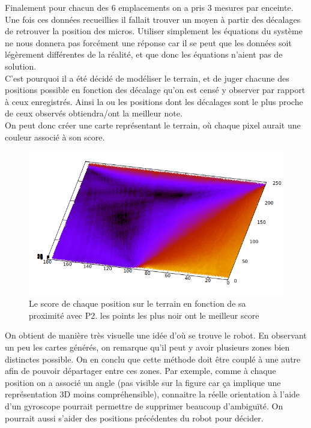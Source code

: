\documentclass[12pt,a4paper]{report}
\begin{document}
Finalement pour chacun des 6 emplacements on a pris 3 mesures par enceinte.\\
Une fois ces données recueillies il fallait trouver un moyen à partir des décalages de retrouver la position des micros. Utiliser simplement les équations du système ne nous donnera pas forcément une réponse car il se peut que les données soit légèrement différentes de la réalité, et que donc les équations n'aient pas de solution. \\
C'est pourquoi il a été décidé de modéliser le terrain, et de juger chacune des positions possible en fonction des décalage qu'on est censé y observer par rapport à ceux enregistrés. Ainsi la ou les positions dont les décalages sont le plus proche de ceux observés obtiendra/ont la meilleur note.\\
On  peut donc créer une carte représentant le terrain, où chaque pixel aurait une couleur associé à son score.
\begin{figure}[H]
\includegraphics[width=15cm]{../tests/simu_coupe_de_france_a_la_main/P2.png}
\caption{Le score de chaque position sur le terrain en fonction de sa proximité avec P2. les points les plus noir ont le meilleur score}
\end{figure}
On obtient de manière très visuelle une idée d'où se trouve le robot.
En observant un peu les cartes générés, on remarque qu'il peut y avoir plusieurs zones bien distinctes possible. On en conclu que cette méthode doit être couplé à une autre afin de pouvoir départager entre ces zones. Par exemple, comme à chaque position on a associé un angle (pas visible sur la figure car ça implique une représentation 3D moins compréhensible), connaitre la réelle orientation à l'aide d'un gyroscope pourrait permettre de supprimer beaucoup d'ambiguïté. On pourrait aussi s'aider des positions précédentes du robot pour décider.
\end{document}
